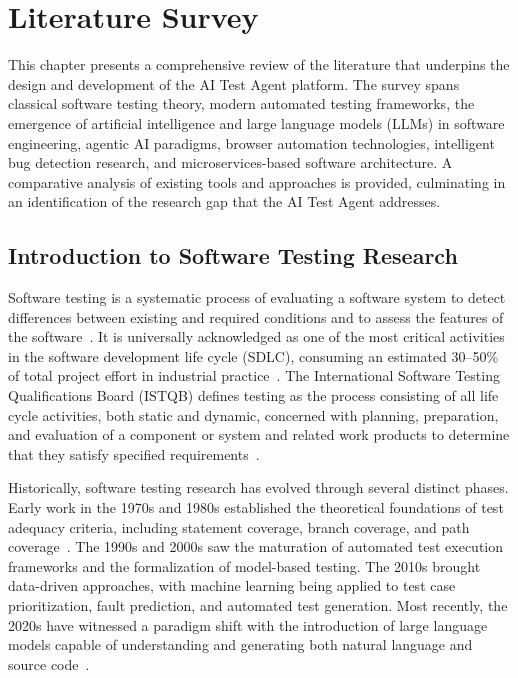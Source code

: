 
\chapter{Literature Survey}
\label{chap:litsurvey}

This chapter presents a comprehensive review of the literature that underpins the
design and development of the AI Test Agent platform. The survey spans classical
software testing theory, modern automated testing frameworks, the emergence of
artificial intelligence and large language models (LLMs) in software engineering,
agentic AI paradigms, browser automation technologies, intelligent bug detection
research, and microservices-based software architecture. A comparative analysis
of existing tools and approaches is provided, culminating in an identification of
the research gap that the AI Test Agent addresses.

\section{Introduction to Software Testing Research}
\label{sec:testing_research_intro}

Software testing is a systematic process of evaluating a software system to
detect differences between existing and required conditions and to assess the
features of the software~\cite{myers2011art}. It is universally acknowledged as
one of the most critical activities in the software development life cycle
(SDLC), consuming an estimated 30--50\% of total project effort in
industrial practice~\cite{aniche2022testing}. The International Software
Testing Qualifications Board (ISTQB) defines testing as the process consisting
of all life cycle activities, both static and dynamic, concerned with planning,
preparation, and evaluation of a component or system and related work products
to determine that they satisfy specified requirements~\cite{istqb2023}.

Historically, software testing research has evolved through several distinct
phases. Early work in the 1970s and 1980s established the theoretical
foundations of test adequacy criteria, including statement coverage, branch
coverage, and path coverage~\cite{myers2011art}. The 1990s and 2000s saw the
maturation of automated test execution frameworks and the formalization of
model-based testing. The 2010s brought data-driven approaches, with machine
learning being applied to test case prioritization, fault prediction, and
automated test generation. Most recently, the 2020s have witnessed a
paradigm shift with the introduction of large language models capable of
understanding and generating both natural language and source
code~\cite{openai2023gpt4, chen2021codex}.

